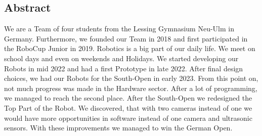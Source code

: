 \subsection{Abstract}
We are a Team of four students from the Lessing Gymnasium Neu-Ulm in Germany. Furthermore, we founded our Team
in 2018 and first participated in the RoboCup Junior in 2019. Robotics is a big part of our daily life.
We meet on school days and even on weekends and Holidays.
\newline
\newline
We started developing our Robots in mid 2022 and had a first Prototype in late 2022. After final design
choices, we had our Robots for the South-Open in early 2023. From this point on, not much progress was
made in the Hardware sector.
After a lot of programming, we managed to reach the second place.
\newline
After the South-Open we redesigned the Top Part of the Robot. We discovered, that with two cameras
instead of one we would have more opportunities in software instead of one camera and ultrasonic sensors.
With these improvements we managed to win the German Open.